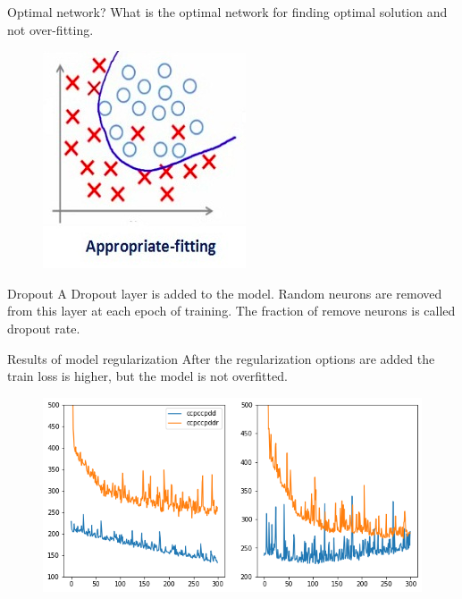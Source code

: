 \documentclass[handout]{beamer}
\begin{document}
\begin{frame}{Optimal network?}
    What is the optimal network for finding optimal solution and not over-fitting.

    \begin{figure}
        \centering
        \includegraphics[width=.6\textwidth]{fig/L2/dropout3.png}
        
    \end{figure}
\end{frame}

\begin{frame}{Dropout}
A \alert{Dropout} layer is added to the model. Random neurons are removed from this layer at each epoch of training. The fraction of remove neurons is called \alert{dropout rate}.
    \begin{figure}
        \centering
{}       
    \end{figure}
\end{frame}

\begin{frame}{Results of model regularization}
    After the regularization options are added the train loss is higher, but the model is not overfitted.

    \begin{figure}
        \centering
        \includegraphics[width=.6\textwidth]{fig/L2/regularization_real2.png}
        
    \end{figure}
\end{frame}
\end{document}
